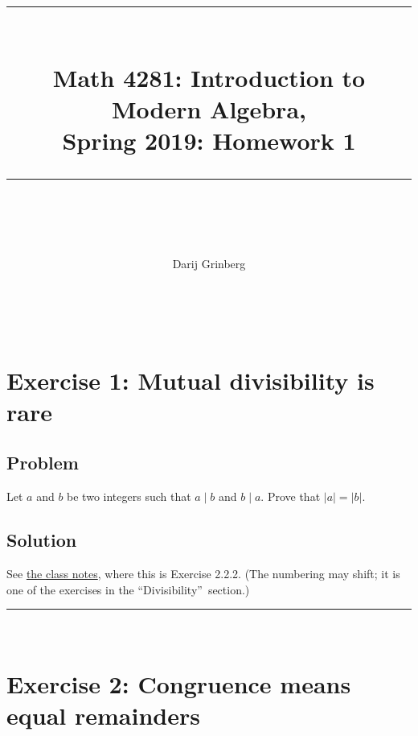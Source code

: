 \documentclass[paper=a4, fontsize=12pt]{scrartcl}%
\theoremstyle{plainsl}
\theoremstyle{definition}
\theoremstyle{remark}
\begin{document}
\title{ \\[25pt] \rule{\linewidth}{0.5pt} \\[0.4cm] {\huge Math 4281: Introduction to Modern Algebra, }\\Spring 2019: Homework 1\\\rule{\linewidth}{2pt} \\[0.5cm] }
\author{Darij Grinberg}
\maketitle

\rule{0pt}{0.3pt} \\[0.4cm]

\section{Exercise 1: Mutual divisibility is rare}

\subsection{Problem}

Let $a$ and $b$ be two integers such that $a \mid b$ and $b \mid a$. Prove
that $\left|  a \right|  = \left|  b \right|  $.

\subsection{Solution}

See \href{http://www-users.math.umn.edu/~dgrinber/19s/notes.pdf}{the class
notes}, where this is Exercise 2.2.2. (The numbering may shift; it is one of
the exercises in the \textquotedblleft Divisibility\textquotedblright\ section.)

\rule{\linewidth}{0.3pt} \\[0.4cm]

\section{Exercise 2: Congruence means equal remainders}
\end{document}
